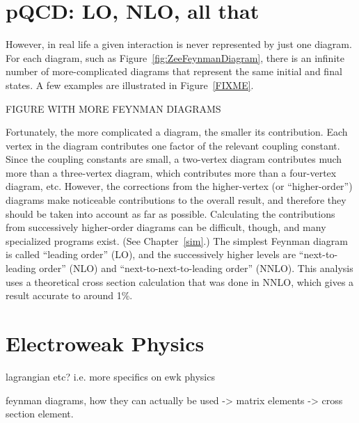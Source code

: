 
\section{pQCD: LO, NLO, all that}



However, in real life a given interaction is 
never represented by just one diagram.  
For each diagram, 
such as Figure~\ref{fig:ZeeFeynmanDiagram}, 
there is an infinite number of 
more-complicated diagrams that 
represent the same initial and final states.  
A few examples are illustrated in Figure~\ref{FIXME}.  

FIGURE WITH MORE FEYNMAN DIAGRAMS

Fortunately, the more complicated a diagram, 
the smaller its contribution.  
Each vertex in the diagram contributes 
one factor of the relevant coupling constant. %
Since the coupling constants are small, 
a two-vertex diagram contributes much more 
than a three-vertex diagram, 
which contributes more than a 
four-vertex diagram, etc.  
However, the corrections from the higher-vertex 
(or ``higher-order'') 
diagrams make noticeable contributions 
to the overall result, 
and therefore they should be taken into 
account as far as possible.  
Calculating the contributions from 
successively higher-order diagrams 
can be difficult, though, 
and many specialized programs exist.  
(See Chapter~\ref{sim}.)  
The simplest Feynman diagram is called 
``leading order'' (LO), 
and the successively higher levels are 
``next-to-leading order'' (NLO) and 
``next-to-next-to-leading order'' (NNLO).  
This analysis uses a theoretical 
cross section calculation that 
was done in NNLO, 
which gives a result accurate to 
around 1\%.  


\section{Electroweak Physics}
\label{theory:EWK}

lagrangian etc? i.e. more specifics on ewk physics

feynman diagrams, how they can actually be used -> 
matrix elements -> cross section element.  

